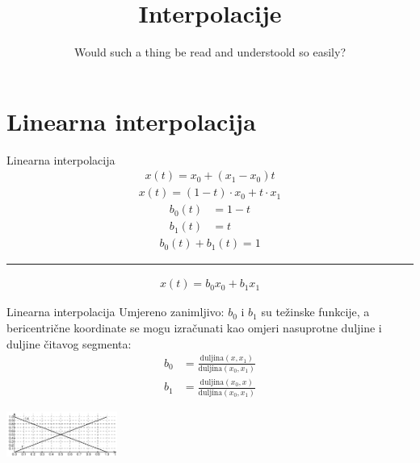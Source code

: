 \documentclass[9pt]{beamer}
\title{Interpolacije}
\subtitle{ Would such a thing be read and understoold so easily?}
\institute{Računalna grafika}
\begin{document}
\begin{frame}
 \titlepage
\end{frame}

\section{Linearna interpolacija}
\begin{frame}{Linearna interpolacija}
	\begin{align*}
	x(t) = x_0 + (x_1-x_0)t
	\end{align*}
	\begin{align*}
	x(t) = (1-t)\cdot x_0 + t\cdot x_1
	\end{align*}
	\begin{align*}
	b_0(t) & = 1-t \\
	b_1(t) & = t
 	\end{align*}
 	\begin{align*}
 	b_0(t) + b_1(t) = 1
 	\end{align*}
 	\hrule\hfill
 	\begin{align*}
 	x(t) = b_0 x_0 + b_1 x_1
 	\end{align*}
\end{frame}
\begin{frame}{Linearna interpolacija}
	Umjereno zanimljivo: $b_0$ i $b_1$ su težinske funkcije, a bericentrične koordinate se mogu izračunati kao omjeri nasuprotne duljine i duljine čitavog segmenta:
	\begin{align*}
	b_0 & = \frac{\textrm{duljina}(x, x_1)}{\textrm{duljina}(x_0, x_1)} \\
	b_1 & = \frac{\textrm{duljina}(x_0, x)}{\textrm{duljina}(x_0, x_1)}
	\end{align*}
	\begin{center}
		\includegraphics[height=1.5cm]{./slike/lin_interp_01.png}
	\end{center}
\end{frame}
\end{document}
